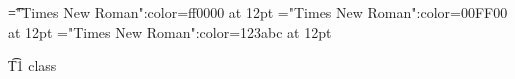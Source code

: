 \documentclass[a4paper]{article}
\begin{document}
 
\pagestyle{plain} 
\sloppy 
\setlength{\parfillskip}{0pt plus 1fil} 
\font\t="Times New Roman":color=ff0000 at 12pt
\font\zt="Times New Roman":color=00FF00 at 12pt
\font\wzt="Times New Roman":color=123abc at 12pt

\pagestyle{fancy} 

\t{T1 class }


\end{document}
